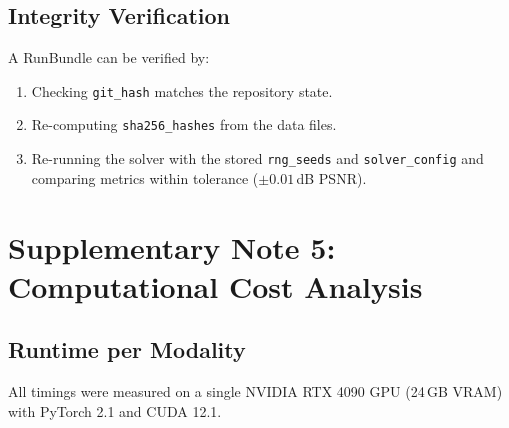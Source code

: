 \documentclass[11pt]{article}
\theoremstyle{definition}
\begin{document}
\subsection{Integrity Verification}

A RunBundle can be verified by:
\begin{enumerate}
  \item Checking \texttt{git\_hash} matches the repository state.
  \item Re-computing \texttt{sha256\_hashes} from the data files.
  \item Re-running the solver with the stored \texttt{rng\_seeds} and
        \texttt{solver\_config} and comparing metrics within tolerance
        ($\pm0.01$\,dB PSNR).
\end{enumerate}

\newpage

\section{Supplementary Note 5: Computational Cost Analysis}
\label{sec:cost}

\subsection{Runtime per Modality}

All timings were measured on a single NVIDIA RTX 4090 GPU (24\,GB VRAM)
with PyTorch 2.1 and CUDA 12.1.
\end{document}
